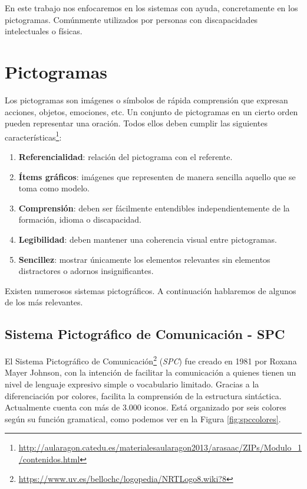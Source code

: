 En este trabajo nos enfocaremos en los sistemas con ayuda, concretamente en los pictogramas. Comúnmente utilizados por personas con discapacidades intelectuales o físicas.


\section{Pictogramas}
\label{cap3:sec:pictogramas}
Los pictogramas son imágenes o símbolos de rápida comprensión que expresan acciones, objetos, emociones, etc. Un conjunto de pictogramas en un cierto orden pueden representar una oración. Todos ellos deben cumplir las siguientes características\footnote{\url{http://aularagon.catedu.es/materialesaularagon2013/arasaac/ZIPs/Modulo_1/contenidos.html}}:
\begin{enumerate}
	\item \textbf{Referencialidad}: relación del pictograma con el referente.
	\item \textbf{Ítems gráficos}: imágenes que representen de manera sencilla aquello que se toma como modelo.
	\item \textbf{Comprensión}: deben ser fácilmente entendibles independientemente de la formación, idioma o discapacidad.
	\item \textbf{Legibilidad}: deben mantener una coherencia visual entre pictogramas.
	\item \textbf{Sencillez}: mostrar únicamente los elementos relevantes sin elementos distractores o adornos insignificantes.
\end{enumerate}


 
Existen numerosos sistemas pictográficos. A continuación hablaremos de algunos de los más relevantes.

\subsection{Sistema Pictográfico de Comunicación - SPC}
\label{cap3:sec:spc}
El Sistema Pictográfico de Comunicación\footnote{\url{https://www.uv.es/bellochc/logopedia/NRTLogo8.wiki?8}} (\textit{SPC}) fue creado en 1981 por Roxana Mayer Johnson, con la intención de facilitar la comunicación a quienes tienen un nivel de lenguaje expresivo simple o vocabulario limitado. Gracias a la diferenciación por colores, facilita la comprensión de la estructura sintáctica. Actualmente cuenta con más de 3.000 iconos. Está organizado por seis colores según su función gramatical, como podemos ver en la Figura \ref{fig:spccolores}.

